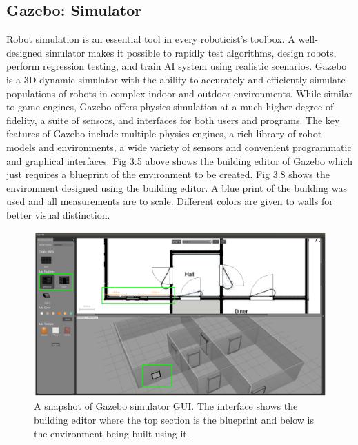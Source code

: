 \subsection{Gazebo: Simulator}
Robot simulation is an essential tool in every roboticist's toolbox. A well-designed simulator makes it possible to rapidly test algorithms, design robots, perform regression testing, and train AI system using realistic scenarios. Gazebo\cite{18} is a 3D dynamic simulator with the ability to accurately and efficiently simulate populations of robots in complex indoor and outdoor environments. While similar to game engines, Gazebo offers physics simulation at a much higher degree of fidelity, a suite of sensors, and interfaces for both users and programs. The key features of Gazebo include\cite{18} multiple physics engines, a rich library of robot models and environments, a wide variety of sensors and convenient programmatic and graphical interfaces. Fig 3.5 above shows the building editor of Gazebo which just requires a blueprint of the environment to be created. Fig 3.8 shows the environment designed using the building editor. A blue print of the building was used and all measurements are to scale. Different colors are given to walls for better visual distinction. 

\begin{figure}
    \centering
    \includegraphics[width=\textwidth]{images/gazebo2.png}
    \caption{A snapshot of Gazebo simulator GUI. The interface shows the building editor where the top section is the blueprint and below is the environment being built using it.}
    \label{fig:gazebo}
\end{figure}

